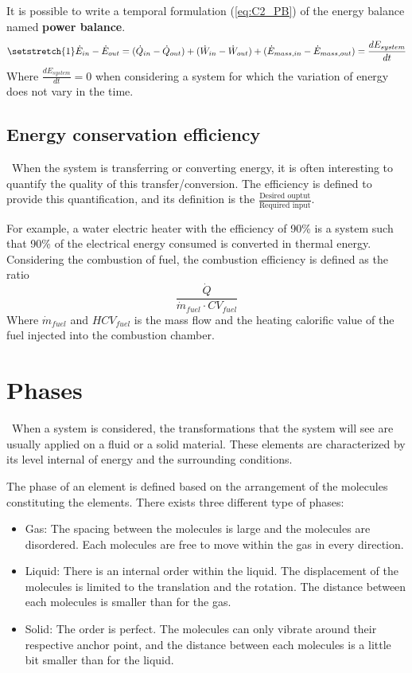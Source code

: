 It is possible to write a temporal formulation (\ref{eq:C2_PB}) of the energy balance named \textbf{power balance}.  
\begin{equation}
\setstretch{1}
    \dot{E}_{in} - \dot{E}_{out} = (\dot{Q}_{in} - \dot{Q}_{out}) + (\dot{W}_{in} - \dot{W}_{out}) + (\dot{E}_{mass,in} - \dot{E}_{mass,out}) = \frac{dE_{system}}{dt} \label{eq:C2_PB}
\end{equation}
Where $\frac{dE_{system}}{dt}=0$ when considering a system for which the variation of energy does not vary in the time.
\subsection{Energy conservation efficiency}
\quad\, When the system is transferring or converting energy, it is often interesting to quantify the quality of this transfer/conversion. The efficiency is defined to provide this quantification, and its definition is the
$\frac{\text{Desired ouptut}}{\text{Required input}}$. 

For example, a water electric heater with the efficiency of 90\% is a system such that 90\% of the electrical energy consumed is converted in thermal energy.  
Considering the combustion of fuel, the combustion efficiency is defined as the ratio
$$ \frac{\dot{Q}}{\dot{m}_{fuel}\cdot CV_{fuel}}$$
Where $\dot{m}_{fuel}$  and $HCV_{fuel}$ is the mass flow and the heating calorific value of the fuel injected into the combustion chamber.

\section{Phases}
\quad\ When a system is considered, the transformations that the system will see are usually applied on a fluid or a solid material. These elements are characterized by its level internal of energy and the surrounding conditions.

The phase of an element is defined based on the arrangement of the molecules constituting the elements. There exists three different type of phases:

\begin{itemize}
    \item Gas: The spacing between the molecules is large and the molecules are disordered. Each molecules are free to move within the gas in every direction.
    \item Liquid: There is an internal order within the liquid. The displacement of the molecules is limited to the translation and the rotation. The distance between each molecules is smaller than for the gas.
    \item Solid: The order is perfect. The molecules can only vibrate around their respective anchor point, and the distance between each molecules is a little bit smaller than for the liquid.
\end{itemize}

